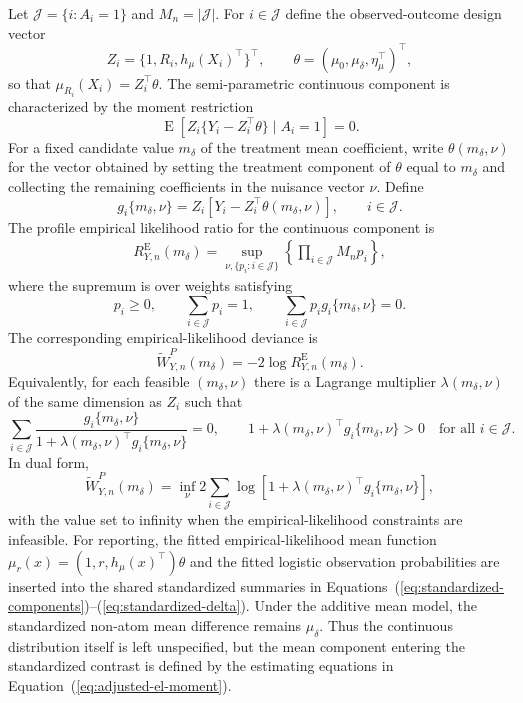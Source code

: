 \documentclass[11pt]{article}
\DeclareMathOperator*{\E}{E}
\begin{document}
Let $\mathcal{J} = \{i : A_i = 1\}$ and $M_n = |\mathcal{J}|$. For $i \in \mathcal{J}$ define the observed-outcome design vector
\[
  Z_i =
  \{1, R_i, h_\mu(X_i)^\top\}^\top,
  \qquad
  \theta =
  (\mu_0,\mu_\delta,\eta_\mu^\top)^\top,
\]
so that $\mu_{R_i}(X_i)=Z_i^\top\theta$. The semi-parametric continuous component is characterized by the moment restriction
\begin{equation}
  \E\!\left[
    Z_i\{Y_i-Z_i^\top\theta\}
    \mid A_i = 1
  \right] = 0.
  \label{eq:adjusted-el-moment}
\end{equation}
For a fixed candidate value $m_\delta$ of the treatment mean coefficient, write $\theta(m_\delta,\nu)$ for the vector obtained by setting the treatment component of $\theta$ equal to $m_\delta$ and collecting the remaining coefficients in the nuisance vector $\nu$. Define
\[
  g_i\{m_\delta,\nu\}
  =
  Z_i\left[Y_i-Z_i^\top\theta(m_\delta,\nu)\right],
  \qquad i \in \mathcal{J}.
\]
The profile empirical likelihood ratio for the continuous component is
\begin{align*}
  R_{Y,n}^{\mathrm{E}}(m_\delta)
  =
  \sup_{\nu,\{p_i:i\in\mathcal{J}\}}
  \left\{
    \prod_{i \in \mathcal{J}} M_n p_i
  \right\},
\end{align*}
where the supremum is over weights satisfying
\[
  p_i \geq 0,
  \qquad
  \sum_{i \in \mathcal{J}} p_i = 1,
  \qquad
  \sum_{i \in \mathcal{J}} p_i g_i\{m_\delta,\nu\}=0.
\]
The corresponding empirical-likelihood deviance is
\begin{equation}
  \widetilde{W}_{Y,n}^P(m_\delta)
  =
  -2\log R_{Y,n}^{\mathrm{E}}(m_\delta).
  \label{eq:adjusted-el-profile}
\end{equation}
Equivalently, for each feasible $(m_\delta,\nu)$ there is a Lagrange multiplier $\lambda(m_\delta,\nu)$ of the same dimension as $Z_i$ such that
\[
  \sum_{i \in \mathcal{J}}
  \frac{g_i\{m_\delta,\nu\}}
  {1+\lambda(m_\delta,\nu)^\top g_i\{m_\delta,\nu\}}
  =0,
  \qquad
  1+\lambda(m_\delta,\nu)^\top g_i\{m_\delta,\nu\} > 0
  \quad\text{for all }i\in\mathcal{J}.
\]
In dual form,
\begin{equation*}
  \widetilde{W}_{Y,n}^P(m_\delta)
  =
  \inf_{\nu}
  2\sum_{i \in \mathcal{J}}
  \log\left[
    1+\lambda(m_\delta,\nu)^\top g_i\{m_\delta,\nu\}
  \right],
\end{equation*}
with the value set to infinity when the empirical-likelihood constraints are infeasible. For reporting, the fitted empirical-likelihood mean function $\mu_r(x)=(1,r,h_\mu(x)^\top)\theta$ and the fitted logistic observation probabilities are inserted into the shared standardized summaries in Equations~(\ref{eq:standardized-components})--(\ref{eq:standardized-delta}). Under the additive mean model, the standardized non-atom mean difference remains $\mu_\delta$. Thus the continuous distribution itself is left unspecified, but the mean component entering the standardized contrast is defined by the estimating equations in Equation~(\ref{eq:adjusted-el-moment}).
\end{document}
